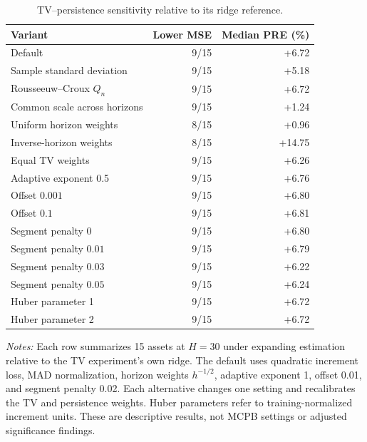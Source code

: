 \begin{table}[!htbp]
\centering\small
\setlength{\tabcolsep}{5pt}
\renewcommand{\arraystretch}{1.10}
\caption{TV--persistence sensitivity relative to its ridge reference.}
\label{tab:legacy_sensitivity}
\begin{tabular}{lrr}
\toprule
Variant & Lower MSE & Median PRE (\%) \\
\midrule
Default & 9/15 & +6.72 \\
Sample standard deviation & 9/15 & +5.18 \\
Rousseeuw--Croux $Q_n$ & 9/15 & +6.72 \\
Common scale across horizons & 9/15 & +1.24 \\
Uniform horizon weights & 8/15 & +0.96 \\
Inverse-horizon weights & 8/15 & +14.75 \\
Equal TV weights & 9/15 & +6.26 \\
Adaptive exponent 0.5 & 9/15 & +6.76 \\
Offset $0.001$ & 9/15 & +6.80 \\
Offset $0.1$ & 9/15 & +6.81 \\
Segment penalty $0$ & 9/15 & +6.80 \\
Segment penalty $0.01$ & 9/15 & +6.79 \\
Segment penalty $0.03$ & 9/15 & +6.22 \\
Segment penalty $0.05$ & 9/15 & +6.24 \\
Huber parameter 1 & 9/15 & +6.72 \\
Huber parameter 2 & 9/15 & +6.72 \\
\bottomrule
\end{tabular}
\par\smallskip
\begin{minipage}{0.98\linewidth}\footnotesize
\textit{Notes:} Each row summarizes 15 assets at $H=30$ under expanding estimation relative to the TV experiment's own ridge. The default uses quadratic increment loss, MAD normalization, horizon weights $h^{-1/2}$, adaptive exponent 1, offset 0.01, and segment penalty 0.02. Each alternative changes one setting and recalibrates the TV and persistence weights. Huber parameters refer to training-normalized increment units. These are descriptive results, not MCPB settings or adjusted significance findings.
\end{minipage}
\end{table}
